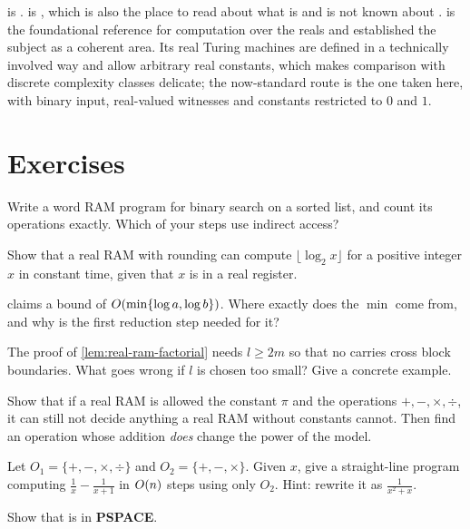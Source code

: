  is \citet{Shamir1979}.
 is \citet{AllenderBurgisserKjeldgaardPedersenMiltersen2009},
which is also the place to read about what is and is not known about
. \citet{BlumCuckerShubSmale1998} is the foundational reference for
computation over the reals and established the subject as a coherent area.
Its real Turing machines are defined in a technically involved way and allow
arbitrary real constants, which makes comparison with discrete complexity
classes delicate; the now-standard route is the one taken here, with binary
input, real-valued witnesses and constants restricted to $0$ and $1$.

\section{Exercises}
\label{sec:ex-real-models}

\begin{exercise}
Write a word RAM program for binary search on a sorted list, and count its
operations exactly. Which of your steps use indirect access?
\end{exercise}

\begin{exercise}
Show that a real RAM with rounding can compute $\lfloor \log_2 x \rfloor$ for a
positive integer $x$ in constant time, given that $x$ is in a real register.
\end{exercise}

\begin{exercise}
 claims a bound of $O\!\left(\min\{\log a, \log b\}\right)$.
Where exactly does the $\min$ come from, and why is the first reduction step
needed for it?
\end{exercise}

\begin{exercise}
The proof of \cref{lem:real-ram-factorial} needs $l \ge 2m$ so that no carries
cross block boundaries. What goes wrong if $l$ is chosen too small? Give a
concrete example.
\end{exercise}

\begin{exercise}
Show that if a real RAM is allowed the constant $\pi$ and the operations
$+,-,\times,\div$, it can still not decide anything a real RAM without
constants cannot. Then find an operation whose addition \emph{does} change the
power of the model.
\end{exercise}

\begin{exercise}
Let $O_1 = \{+,-,\times,\div\}$ and $O_2 = \{+,-,\times\}$. Given $x$, give a
straight-line program computing $\frac{1}{x} - \frac{1}{x+1}$ in $O\!\left(n\right)$
steps using only $O_2$.
Hint: rewrite it as $\frac{1}{x^2+x}$.
\end{exercise}

\begin{exercise}
Show that  is in \textbf{PSPACE}.
\end{exercise}
